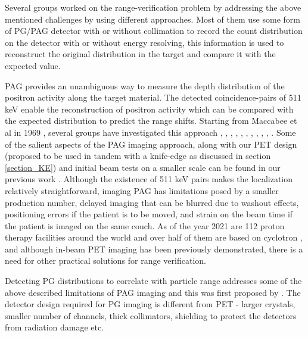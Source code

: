 \documentclass[11pt,a4paper]{article}
\begin{document}
Several groups worked on the range-verification problem by addressing  the above mentioned challenges by using different approaches. Most of them use some form of PG/PAG detector with or without collimation to record the count distribution on the detector with or without energy resolving, this information is used to reconstruct the original distribution in the target and compare it with the expected value.

PAG provides an unambiguous way to measure the depth distribution of the positron activity along the target material. The detected coincidence-pairs of 511 keV enable the reconstruction of positron activity which can be compared with the expected distribution to predict the range shifts.  Starting from Maccabee et al in 1969 \cite{Maccabee1969},  several groups have investigated this approach  \cite{Bennett1975}, \cite{Enghardt1992}, \cite{Parodi2001}, \cite{Parodi2007}, \cite{Nishio2010}, \cite{Shao2014}, \cite{Piliero2016}, \cite{Binet2018}, \cite{Crespo2005}, \cite{Buitenhuis2017} ,  \cite{Tashima2020}. Some of the salient aspects of the PAG imaging approach, along with our PET design (proposed to be used in  tandem with a knife-edge as discussed in section \ref{section_KE}) and initial beam tests on a smaller scale can be found in our previous work \cite{Nemallapudi2021}. Although the existence of 511 keV pairs makes the localization relatively  straightforward, imaging PAG has limitations posed by a smaller production number, delayed imaging that can be blurred due to washout effects, positioning errors if the patient is to be moved, and strain on the beam time if the patient is imaged on the same couch. As of the year 2021 are 112 proton therapy facilities around the world and over half of them are based on cyclotron \cite{PTCOG2021}, and although in-beam PET imaging has been previously demonstrated, there is a need for other practical solutions for range verification. 

Detecting PG distributions to correlate with particle range addresses some of the above described limitations of PAG imaging and this was first proposed by \cite{Stichelbaut2003}. The detector design required for PG imaging is different from PET - larger crystals, smaller number of channels, thick collimators, shielding to protect the detectors from radiation damage etc. 

%
 
\end{document}
